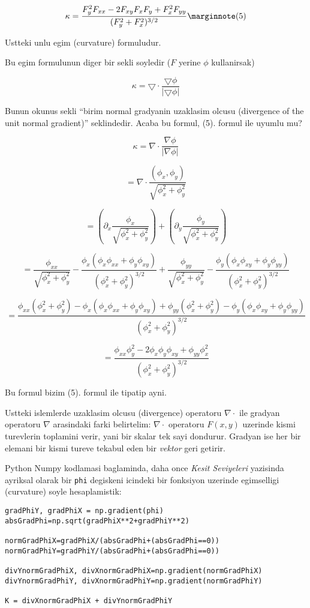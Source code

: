 \documentclass[12pt,fleqn]{article}\usepackage{../common}
\begin{document}
\[
\kappa = \frac{F_y^2F_{xx} - 2F_{xy}F_xF_y +
    F_x^2F_{yy}}{(F_y^2 + F_x^2)^{3/2}}
\mlabel{5}
\]

Ustteki unlu egim (curvature) formuludur. 

Bu egim formulunun diger bir sekli soyledir ($F$ yerine $\phi$ kullanirsak)

\[ \kappa = \bigtriangledown \cdot \frac{\bigtriangledown \phi}{|\bigtriangledown \phi|} \]

Bunun okunus sekli ``birim normal gradyanin uzaklasim olcusu (divergence of the
unit normal gradient)'' seklindedir. Acaba bu formul, (5). formul ile
uyumlu mu?

\[ \kappa = \nabla \cdot \frac{\nabla \phi}{|\nabla \phi|}  \]

\[ = \nabla \cdot \frac{(\phi_x,\phi_y)}{\sqrt{\phi_x^2+\phi_y^2}} \]

\[ = \left(\partial_x \frac{\phi_x}{\sqrt{\phi_x^2+\phi_y^2}}\right)+ 
\left(\partial_y \frac{\phi_y}{\sqrt{\phi_x^2+\phi_y^2}}\right)  \]

\[ = \frac{\phi_{xx}}{\sqrt{\phi_x^2+\phi_y^2}} - \frac{\phi_x (\phi_x\phi_{xx}+\phi_y\phi_{xy})}
{(\phi_x^2+\phi_y^2)^{3/2}} +
\frac{\phi_{yy}}{\sqrt{\phi_x^2+\phi_y^2}} - \frac{\phi_y(\phi_x\phi_{xy}+\phi_y\phi_{yy})}
{(\phi_x^2+\phi_y^2)^{3/2}}  \]

\[ = \frac{\phi_{xx}(\phi_x^2+\phi_y^2) - \phi_x
  (\phi_x\phi_{xx}+\phi_y\phi_{xy}) +\phi_{yy}(\phi_x^2+\phi_y^2) -
  \phi_y(\phi_x\phi_{xy}+\phi_y\phi_{yy})}{(\phi_x^2+\phi_y^2)^{3/2}} \]

\[ = \frac{\phi_{xx}\phi_y^2 - 2\phi_x\phi_y\phi_{xy} + \phi_{yy}\phi_x^2}{(\phi_x^2+\phi_y^2)^{3/2}}  \]

Bu formul bizim (5). formul ile tipatip ayni.

Ustteki islemlerde uzaklasim olcusu (divergence) operatoru $\nabla \cdot$ ile
gradyan operatoru $\nabla$ arasindaki farki belirtelim:  $\nabla \cdot$
operatoru $F(x,y)$ uzerinde kismi turevlerin toplamini verir, yani bir skalar
tek sayi dondurur. Gradyan ise her bir elemani bir kismi tureve tekabul eden bir
{\em vektor} geri getirir. 

Python Numpy kodlamasi baglaminda, daha once {\em Kesit Seviyeleri} yazisinda
ayriksal olarak bir \verb!phi! degiskeni icindeki bir fonksiyon uzerinde
egimselligi (curvature) soyle hesaplamistik:

\begin{verbatim}
gradPhiY, gradPhiX = np.gradient(phi)
absGradPhi=np.sqrt(gradPhiX**2+gradPhiY**2)                               

normGradPhiX=gradPhiX/(absGradPhi+(absGradPhi==0))
normGradPhiY=gradPhiY/(absGradPhi+(absGradPhi==0))

divYnormGradPhiX, divXnormGradPhiX=np.gradient(normGradPhiX)
divYnormGradPhiY, divXnormGradPhiY=np.gradient(normGradPhiY)
                       
K = divXnormGradPhiX + divYnormGradPhiY
\end{verbatim}
\end{document}
